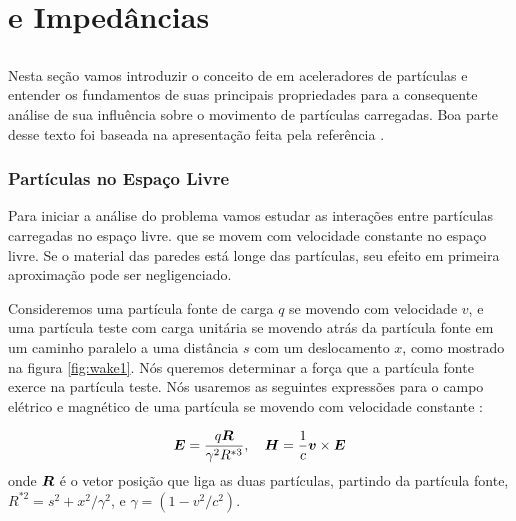 \chapter{ e Impedâncias}\label{cap:wake_impedances}

\section{}

Nesta seção vamos introduzir o conceito de  em aceleradores de partículas e entender os fundamentos de suas principais propriedades para a consequente análise de sua influência sobre o movimento de partículas carregadas. Boa parte desse texto foi baseada na apresentação feita pela referência \cite{Stupakov2000a}.

\subsection{Partículas no Espaço Livre}\label{ssec:particles_free_space}

Para iniciar a análise do problema vamos estudar as interações entre partículas carregadas no espaço livre. que se movem com velocidade constante no espaço livre. Se o material das paredes está longe das partículas, seu efeito em primeira aproximação pode ser negligenciado.

Consideremos uma partícula fonte de carga $q$ se movendo com velocidade $v$, e uma partícula teste com carga unitária se movendo atrás da partícula fonte em um caminho paralelo a uma distância $s$ com um deslocamento $x$, como mostrado na figura \ref{fig:wake1}. Nós queremos determinar a força que a partícula fonte exerce na partícula teste.
Nós usaremos as seguintes expressões para o campo elétrico e magnético de uma partícula se movendo com velocidade constante :

\begin{equation}
 \label{eq:fields_free_particle}
 \boldsymbol{E} = \frac{q\boldsymbol{R}}{\gamma^2 R^{*3}}, \quad \boldsymbol{H} = \frac1c\boldsymbol{v} \times \boldsymbol{E} 
\end{equation}
onde $\boldsymbol{R}$ é o vetor posição que liga as duas partículas, partindo da partícula fonte, $R^{*2} = s^2 + x^2/\gamma^2$, e $\gamma = (1-v^2/c^2)$.

